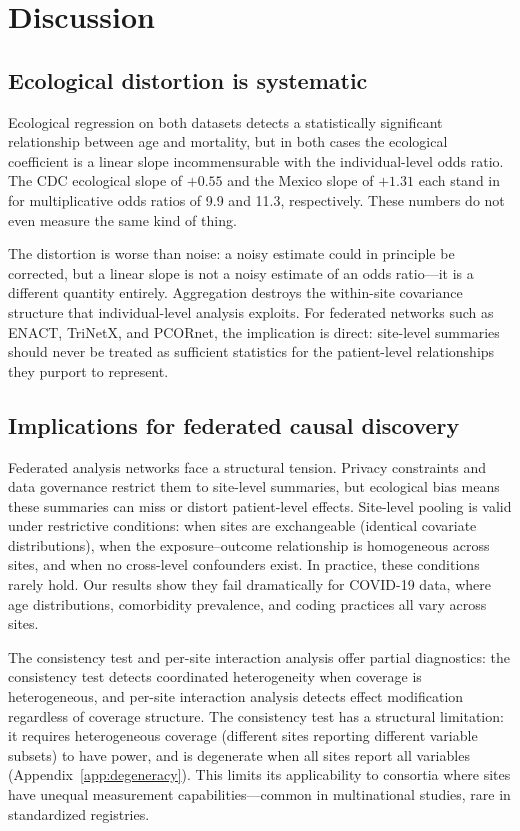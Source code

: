 \documentclass[11pt]{article}
\begin{document}
\section{Discussion}

\subsection{Ecological distortion is systematic}

Ecological regression on both datasets detects a statistically significant
relationship between age and mortality, but in both cases the ecological
coefficient is a linear slope incommensurable with the individual-level odds
ratio.  The CDC ecological slope of $+0.55$ and the Mexico slope of $+1.31$
each stand in for multiplicative odds ratios of 9.9 and 11.3, respectively.
These numbers do not even measure the same kind of thing.

The distortion is worse than noise: a noisy estimate could in principle be
corrected, but a linear slope is not a noisy estimate of an odds ratio---it
is a different quantity entirely.  Aggregation destroys the within-site
covariance structure that individual-level analysis exploits.  For
federated networks such as ENACT, TriNetX, and PCORnet, the implication
is direct: site-level summaries should never be treated as sufficient
statistics for the patient-level relationships they purport to represent.

\subsection{Implications for federated causal discovery}

Federated analysis networks face a structural tension.  Privacy
constraints and data governance restrict them to site-level summaries, but
ecological bias means these summaries can miss or distort patient-level
effects.  Site-level pooling is valid under restrictive conditions: when
sites are exchangeable (identical covariate distributions), when the
exposure--outcome relationship is homogeneous across sites, and when no
cross-level confounders exist.  In practice, these conditions rarely hold.
Our results show they fail dramatically for COVID-19 data, where age
distributions, comorbidity prevalence, and coding practices all vary
across sites.

The consistency test and per-site interaction analysis offer partial
diagnostics: the consistency test detects coordinated heterogeneity when
coverage is heterogeneous, and per-site interaction analysis detects
effect modification regardless of coverage structure.  The consistency
test has a structural limitation: it requires heterogeneous coverage
(different sites reporting different variable subsets) to have power, and
is degenerate when all sites report all variables
(Appendix~\ref{app:degeneracy}).  This limits its applicability to
consortia where sites have unequal measurement capabilities---common in
multinational studies, rare in standardized registries.
\end{document}
